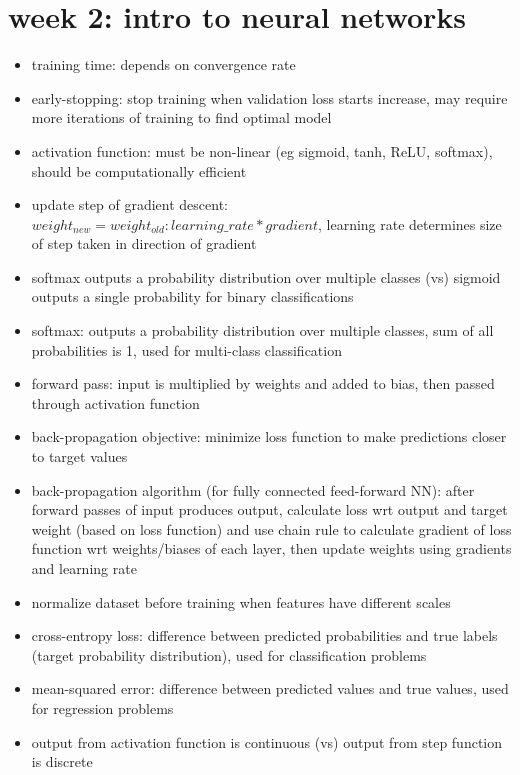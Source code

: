 \documentclass[10pt]{article}
\begin{document}
\section*{week 2: intro to neural networks}

\begin{itemize}[label=\(\star\), leftmargin=1em, itemsep=-0.3em]
    \item training time: depends on convergence rate
    \item early-stopping: stop training when validation loss starts increase, may require more iterations of training to find optimal model
    \item activation function: must be non-linear (eg sigmoid, tanh, ReLU, softmax), should be computationally efficient
    \item update step of gradient descent: $weight_{new} = weight_{old}: learning\_rate * gradient$, learning rate determines size of step taken in direction of gradient
    \item softmax outputs a probability distribution over multiple classes (vs) sigmoid outputs a single probability for binary classifications
    \item softmax: outputs a probability distribution over multiple classes, sum of all probabilities is 1, used for multi-class classification
    \item forward pass: input is multiplied by weights and added to bias, then passed through activation function
    \item back-propagation objective: minimize loss function to make predictions closer to target values
    \item back-propagation algorithm (for fully connected feed-forward NN): after forward passes of input produces output, calculate loss wrt output and target weight (based on loss function) and use chain rule to calculate gradient of loss function wrt weights/biases of each layer, then update weights using gradients and learning rate
    \item normalize dataset before training when features have different scales
    \item cross-entropy loss: difference between predicted probabilities and true labels (target probability distribution), used for classification problems
    \item mean-squared error: difference between predicted values and true values, used for regression problems
    \item output from activation function is continuous (vs) output from step function is discrete

\end{itemize}
\end{document}
